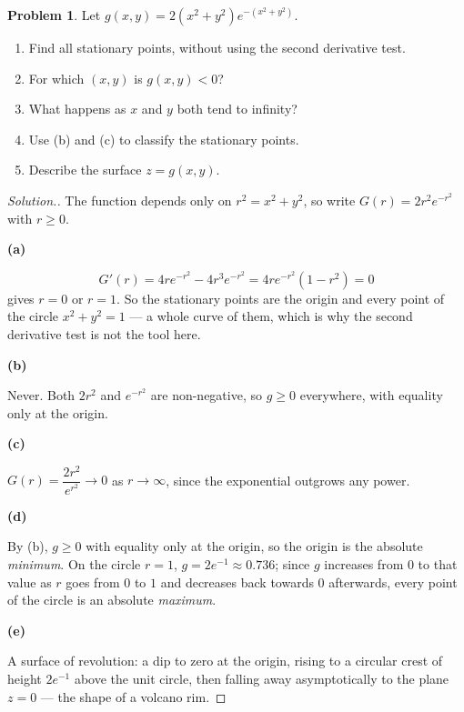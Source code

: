 \documentclass[11pt,a4paper]{article}
\theoremstyle{definition}
\newtheorem{problemx}{Problem}[subsection]
\newenvironment{problem}{\begin{problemx}}{\end{problemx}}
\newenvironment{solution}
  {\renewcommand{\qedsymbol}{}\begin{proof}[\textit{Solution}.]}
  {\end{proof}}
\newcommand{\subhead}[1]{%
  \par\medskip\noindent\textbf{#1}\par\nobreak\smallskip}
\begin{document}
\begin{problem}
Let $g(x,y) = 2(x^2+y^2)e^{-(x^2+y^2)}$.
\begin{enumerate}
\item[(a)] Find all stationary points, without using the second derivative test.
\item[(b)] For which $(x,y)$ is $g(x,y)<0$?
\item[(c)] What happens as $x$ and $y$ both tend to infinity?
\item[(d)] Use (b) and (c) to classify the stationary points.
\item[(e)] Describe the surface $z = g(x,y)$.
\end{enumerate}
\end{problem}
\begin{solution}
The function depends only on $r^2 = x^2+y^2$, so write
$G(r) = 2r^2e^{-r^2}$ with $r\geq 0$.

\subhead{(a)}
\[G'(r) = 4re^{-r^2} - 4r^3e^{-r^2} = 4re^{-r^2}(1-r^2) = 0\]
gives $r=0$ or $r=1$. So the stationary points are the origin and every point of
the circle $x^2+y^2 = 1$ --- a whole curve of them, which is why the second
derivative test is not the tool here.

\subhead{(b)}
Never. Both $2r^2$ and $e^{-r^2}$ are non-negative, so $g\geq 0$ everywhere,
with equality only at the origin.

\subhead{(c)}
$G(r) = \dfrac{2r^2}{e^{r^2}}\rightarrow 0$ as $r\rightarrow\infty$, since the
exponential outgrows any power.

\subhead{(d)}
By (b), $g\geq 0$ with equality only at the origin, so the origin is the
absolute \emph{minimum}. On the circle $r=1$, $g = 2e^{-1}\approx 0.736$; since
$g$ increases from $0$ to that value as $r$ goes from $0$ to $1$ and decreases
back towards $0$ afterwards, every point of the circle is an absolute
\emph{maximum}.

\subhead{(e)}
A surface of revolution: a dip to zero at the origin, rising to a circular
crest of height $2e^{-1}$ above the unit circle, then falling away
asymptotically to the plane $z=0$ --- the shape of a volcano rim.
\end{solution}
\end{document}
